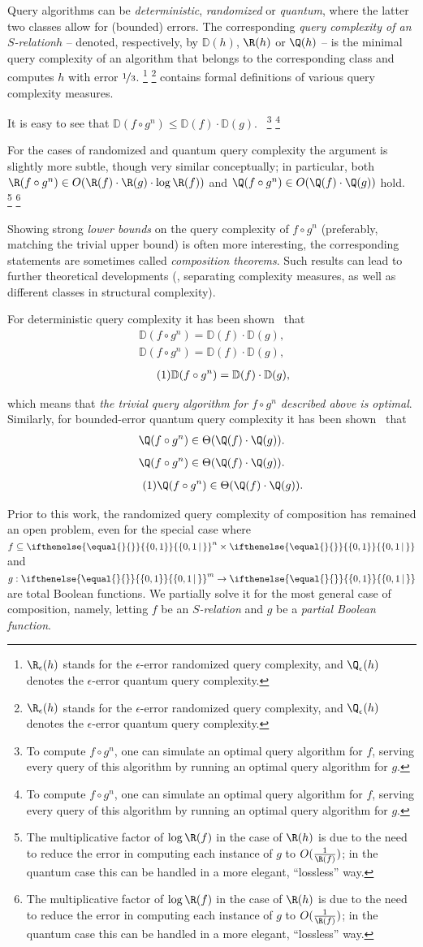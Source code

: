 \documentclass{toc}
\newcommand{\arelation}{an $S$-relation\xspace} %
\newcommand{\md}{\middle}
\newcommand{\malabel}[1]{\addtocounter{equation}{1}\tag{\theequation}\label{#1}}
\newcommand{\m}[2][]{%
\ifthenelse{\equal{}{#1}}%
{\begin{align*} #2 \end{align*}}%
{\ifthenelse{\eq<ual{P}{#1}}%
{\begingroup\allowdisplaybreaks\begin{align*} #2%
\end{align*}\endgroup}%
{\begin{align*} \malabel{#1} #2 \end{align*}}%
}%
}
\newcommand{\dr}{\nicefrac}
\newcommand{\set}[2][]{\ifthenelse{\equal{}{#1}}%
{\ensuremath{\left\{#2\right\}}}%
{\ensuremath{\left\{#2\,\md|\,#1\right\}}}}
\newcommand{\asO}[1]{O(#1)}
\newcommand{\OI}{\set{0,1}}
\newcommand{\fn}[2][]{%
\ifthenelse{\equal{}{#1}}%
{\footnote{#2}}%
{\footnote{\label{#1}#2}}%
}
\newcommand{\tm}{\cdot}
\newcommand{\e}{\emph}
\newcommand{\D}{\mathbb{D}}
\begin{document}
Query algorithms can be \e{deterministic}, \e{randomized} or \e{quantum}, where the latter two classes allow for (bounded) errors.
The corresponding \e{query complexity of
%
\arelation $h$}
-- denoted, respectively, by $\D(h)$, $\R(h)$ or $\Q(h)$ -- is the minimal query complexity of an algorithm that belongs to the corresponding class and computes $h$ with error $\dr13$. 
\fn{%
 $\R_\epsilon(h)$
%
  stands for the
$\epsilon$-error  %
  randomized %
  query complexity,
%
and $\Q_\epsilon(h)$ denotes the $\epsilon$-error
quantum query complexity.  %
}  contains formal definitions of various query complexity measures.

It is easy to see that $\D(f \circ g^n) \leq \D(f) \cdot \D(g)$.~\fn
{To compute $f\circ g^n$, one can simulate an optimal query algorithm for $f$, serving every query of this algorithm by running an optimal query algorithm for $g$.}
For the cases of randomized and quantum query complexity the argument is slightly more subtle, though very similar conceptually; in particular, both $\R(f \circ g^n) \in \asO{\R(f) \cdot \R(g) \tm \log \R(f)}$ and $\Q(f \circ g^n) \in \asO{\Q(f) \cdot \Q(g)}$ hold.~\fn
{The multiplicative factor of $\log \R(f)$ in the case of $\R(h)$ is due to the need to reduce the error in computing each instance of $g$ to $\asO{\frac{1}{\R(f)}}$; in the quantum case this can be handled in a more elegant, ``lossless'' way.}

Showing strong \emph{lower bounds} on the query complexity of $f \circ g^n$ (preferably, matching the trivial upper bound) is often more interesting, the corresponding statements are sometimes called \emph{composition theorems}.
Such results can lead to further theoretical developments (\eg, separating complexity measures, as well as different classes in structural complexity).

For deterministic query complexity it has been shown~\cite{DBLP:journals/cjtcs/Montanaro14, Tal13} that
\m{
	\D(f \circ g^n) = \D(f) \cdot \D(g)
,}
which means that \e{the trivial query algorithm for $f \circ g^n$ described above is optimal}.
Similarly, for bounded-error quantum query complexity it has been shown~\cite{DBLP:conf/stoc/HoyerLS07,DBLP:conf/soda/Reichardt11a} that
\m{
	\Q(f \circ g^n) \in \Theta(\Q(f) \cdot \Q(g))
.}

Prior to this work, the randomized query complexity of composition has remained an open problem, even for the special case where $f \subseteq \OI^n \times \OI$ and $g:\OI^m \to \OI$  %
are   %
total Boolean %
functions.  %
We partially solve it for the most general case of
composition, namely,  %
%
letting $f$ be %
an \e{$S$-relation}  %
and $g$ be a \e{partial Boolean function}.
\end{document}
